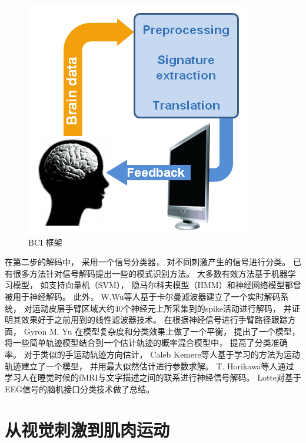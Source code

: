 \begin{figure}[htb]
\centering
\includegraphics[scale=0.8]{Pictures/Chap1/bci_cycle_v2-2.png}
\caption{BCI 框架\cite{farwell1988talking}}
\label{Fig:bci_brief}
\end{figure}

在第二步的解码中， 采用一个信号分类器， 对不同刺激产生的信号进行分类。 已有很多方法针对信号解码提出一些的模式识别方法。 大多数有效方法基于机器学习模型\cite{blankertz2006berlin,lotte2007review,muller2008machine}， 如支持向量机（SVM）\cite{cortes1995support}， 隐马尔科夫模型（HMM）和神经网络模型都曾被用于神经解码。 此外， W.Wu等人基于卡尔曼滤波器建立了一个实时解码系统， 对运动皮层手臂区域大约40个神经元上所采集到的spike活动进行解码， 并证明其效果好于之前用到的线性滤波器技术\cite{wu2003neural}。 在根据神经信号进行手臂路径跟踪方面， Gyron M. Yu 在模型复杂度和分类效果上做了一个平衡， 提出了一个模型， 将一些简单轨迹模型结合到一个估计轨迹的概率混合模型中， 提高了分类准确率\cite{byron2007mixture}。 对于类似的手运动轨迹方向估计， Caleb Kemere等人基于学习的方法为运动轨迹建立了一个模型， 并用最大似然估计进行参数求解\cite{kemere2004model}。 T. Horikawa等人通过学习人在睡觉时候的fMRI与文字描述之间的联系进行神经信号解码\cite{horikawa2013neural}。 Lotte对基于EEG信号的脑机接口分类技术做了总结\cite{lotte2007review}。


\section{从视觉刺激到肌肉运动}

